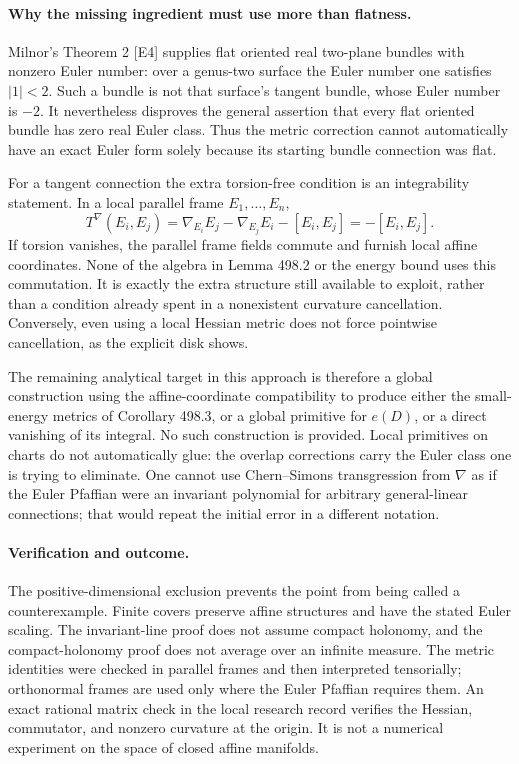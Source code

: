 \documentclass[11pt]{article}
\begin{document}
\paragraph{Why the missing ingredient must use more than flatness.}
Milnor's Theorem 2 [E4] supplies flat oriented real two-plane bundles with
nonzero Euler number: over a genus-two surface the Euler number one
satisfies $|1|<2$. Such a bundle is not that surface's tangent bundle,
whose Euler number is $-2$. It nevertheless disproves the general assertion
that every flat oriented bundle has zero real Euler class. Thus the metric
correction cannot automatically have an exact Euler form solely because
its starting bundle connection was flat.

For a tangent connection the extra torsion-free condition is an
integrability statement. In a local parallel frame $E_1,\ldots,E_n$,
\[
 T^\nabla(E_i,E_j)=\nabla_{E_i}E_j-\nabla_{E_j}E_i-[E_i,E_j]
                  =-[E_i,E_j].
\]
If torsion vanishes, the parallel frame fields commute and furnish local
affine coordinates. None of the algebra in Lemma 498.2 or the energy bound
uses this commutation. It is exactly the extra structure still available
to exploit, rather than a condition already spent in a nonexistent
curvature cancellation. Conversely, even using a local Hessian metric
does not force pointwise cancellation, as the explicit disk shows.

The remaining analytical target in this approach is therefore a global
construction using the affine-coordinate compatibility to produce either
the small-energy metrics of Corollary 498.3, or a global primitive for
$e(D)$, or a direct vanishing of its integral. No such construction is
provided. Local primitives on charts do not automatically glue: the
overlap corrections carry the Euler class one is trying to eliminate.
One cannot use Chern--Simons transgression from $\nabla$ as if the Euler
Pfaffian were an invariant polynomial for arbitrary general-linear
connections; that would repeat the initial error in a different notation.

\paragraph{Verification and outcome.}
The positive-dimensional exclusion prevents the point from being called
a counterexample. Finite covers preserve affine structures and have the
stated Euler scaling. The invariant-line proof does not assume compact
holonomy, and the compact-holonomy proof does not average over an infinite
measure. The metric identities were checked in parallel frames and then
interpreted tensorially; orthonormal frames are used only where the Euler
Pfaffian requires them. An exact rational matrix check in the local
research record verifies the Hessian, commutator, and nonzero curvature
at the origin. It is not a numerical experiment on the space of closed
affine manifolds.
\end{document}
